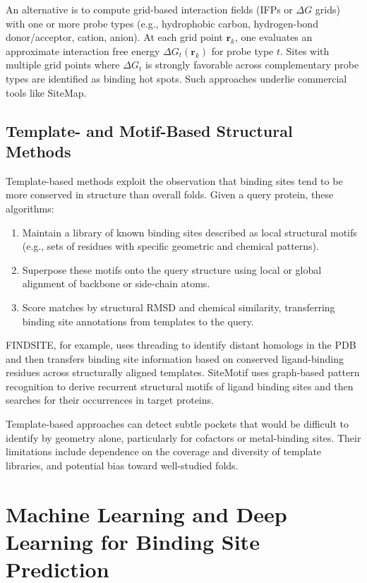\documentclass[12pt,a4paper]{article}
\begin{document}
An alternative is to compute grid-based interaction fields (IFPs or \(\Delta G\) grids) with one or more probe types (e.g., hydrophobic carbon, hydrogen-bond donor/acceptor, cation, anion). At each grid point \(\mathbf{r}_k\), one evaluates an approximate interaction free energy \(\Delta G_t(\mathbf{r}_k)\) for probe type \(t\). Sites with multiple grid points where \(\Delta G_t\) is strongly favorable across complementary probe types are identified as binding hot spots. Such approaches underlie commercial tools like SiteMap.\cite{CH5_Halgren2009}

\subsection{Template- and Motif-Based Structural Methods}

Template-based methods exploit the observation that binding sites tend to be more conserved in structure than overall folds. Given a query protein, these algorithms:
\begin{enumerate}
    \item Maintain a library of known binding sites described as local structural motifs (e.g., sets of residues with specific geometric and chemical patterns).
    \item Superpose these motifs onto the query structure using local or global alignment of backbone or side-chain atoms.
    \item Score matches by structural RMSD and chemical similarity, transferring binding site annotations from templates to the query.\cite{CH5_ghersi2011beyond,CH5_SiteMotif2022}
\end{enumerate}

FINDSITE, for example, uses threading to identify distant homologs in the PDB and then transfers binding site information based on conserved ligand-binding residues across structurally aligned templates.\cite{CH5_Brylinski2008FINDSITE} SiteMotif uses graph-based pattern recognition to derive recurrent structural motifs of ligand binding sites and then searches for their occurrences in target proteins.\cite{CH5_SiteMotif2022}

Template-based approaches can detect subtle pockets that would be difficult to identify by geometry alone, particularly for cofactors or metal-binding sites. Their limitations include dependence on the coverage and diversity of template libraries, and potential bias toward well-studied folds.\cite{CH5_ghersi2011beyond}

\section{Machine Learning and Deep Learning for Binding Site Prediction}
\end{document}
